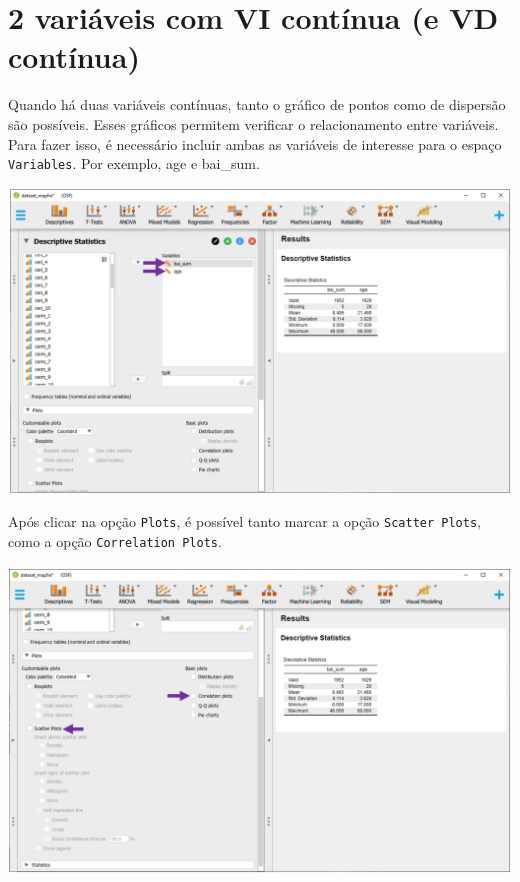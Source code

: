 \documentclass[
]{book}
\begin{document}
\hypertarget{variuxe1veis-com-vi-contuxednua-e-vd-contuxednua-1}{%
\section{2 variáveis com VI contínua (e VD contínua)}\label{variuxe1veis-com-vi-contuxednua-e-vd-contuxednua-1}}

Quando há duas variáveis contínuas, tanto o gráfico de pontos como de dispersão são possíveis. Esses gráficos permitem verificar o relacionamento entre variáveis. Para fazer isso, é necessário incluir ambas as variáveis de interesse para o espaço \texttt{Variables}. Por exemplo, age e bai\_sum.

\includegraphics{./img/cap_desc_jasp_grafico_scatter1.png}

Após clicar na opção \texttt{Plots}, é possível tanto marcar a opção \texttt{Scatter\ Plots}, como a opção \texttt{Correlation\ Plots}.

\includegraphics{./img/cap_desc_jasp_grafico_scatter2.png}
\end{document}
